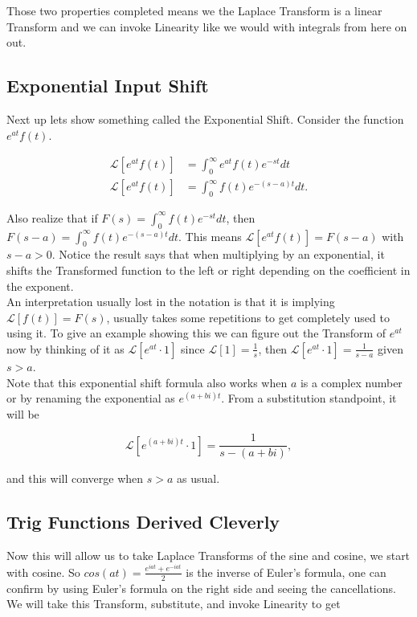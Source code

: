 \documentclass[12pt]{article}
\newcommand{\lp}{\mathscr{L}}
\begin{document}
Those two properties completed means we the Laplace Transform is a linear Transform and we can invoke Linearity like we would with integrals from here on out.

\subsection{Exponential Input Shift}

Next up lets show something called the Exponential Shift. Consider the function $e^{at}f(t)$.

\begin{align*}
    \lp[e^{at}f(t)]&=\int_0^{\infty} e^{at}f(t) e^{-st} dt \\
    \lp[e^{at}f(t)]&=\int_0^{\infty} f(t) e^{-(s-a)t} dt.
\end{align*}

Also realize that if $F(s)=\int_0^{\infty} f(t) e^{-st} dt$, then $F(s-a)=\int_0^{\infty} f(t) e^{-(s-a)t} dt$. This means $\lp[e^{at}f(t)]=F(s-a)$ with $s-a>0$. Notice the result says that when multiplying by an exponential, it shifts the Transformed function to the left or right depending on the coefficient in the exponent. \\

An interpretation usually lost in the notation is that it is implying $\lp[f(t)]=F(s)$, usually takes some repetitions to get completely used to using it. To give an example showing this we can figure out the Transform of $e^{at}$ now by thinking of it as $\lp[e^{at}\cdot 1]$ since $\lp[1]=\frac{1}{s}$, then $\lp[e^{at} \cdot 1]=\frac{1}{s-a}$ given $s>a$. \\

Note that this exponential shift formula also works when $a$ is a complex number or by renaming the exponential as $e^{(a+bi)t}$. From a substitution standpoint, it will be 

\begin{equation*}
 \lp[e^{(a+bi)t}\cdot 1]=\frac{1}{s-(a+bi)},
\end{equation*}

and this will converge when $s>a$ as usual. \\

\subsection{Trig Functions Derived Cleverly}

Now this will allow us to take Laplace Transforms of the sine and cosine, we start with cosine. So $cos(at)=\frac{e^{iat}+e^{-iat}}{2}$ is the inverse of Euler's formula, one can confirm by using Euler's formula on the right side and seeing the cancellations. We will take this Transform, substitute, and invoke Linearity to get
\end{document}

